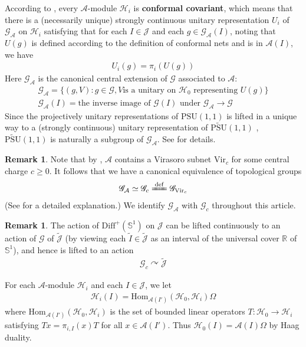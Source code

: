 \documentclass[11pt,b5paper,notitlepage]{article}
\theoremstyle{definition}
\newtheorem{rem}[df]{Remark}
\theoremstyle{plain}
\newcommand{\mc}{\mathcal}
\newcommand{\wtd}{\widetilde}
\newcommand{\Hom}{\mathrm{Hom}}
\newcommand{\Diffp}{\mathrm{Diff}^+}
\newcommand{\PSU}{\mathrm{PSU}(1,1)}
\newcommand{\Vir}{\mathrm{Vir}}
\newcommand{\scr}{\mathscr}
\newcommand{\Jtd}{\widetilde{\mathcal J}}
\newcommand{\Rbb}{\mathbb R}
\newcommand{\UPSU}{\widetilde{\mathrm{PSU}}(1,1)}
\newcommand{\Sbb}{{\mathbb S}}
\newcommand{\Gc}{\mathscr G_c}
\numberwithin{equation}{section}
\begin{document}
According to \cite{Hen19}, every $\mc A$-module $\mc H_i$ is \textbf{conformal covariant}, which means that there is a (necessarily unique) strongly continuous unitary representation $U_i$ of $\scr G_{\mc A}$ on $\mc H_i$ satisfying that for each $I\in\mc J$ and each $g\in\scr G_{\mc A}(I)$, noting that $U(g)$ is defined according to the definition of conformal nets and is in $\mc A(I)$, we have
\begin{align}\label{eq9}
U_i(g)=\pi_i(U(g))
\end{align}
Here $\scr G_{\mc A}$ is the canonical central extension of $\scr G$ associated to $\mc A$:
\begin{gather*}
\scr G_{\mc A}=\{(g,V):g\in\scr G,V\text{is a unitary on $\mc H_0$ representing $U(g)$}\}\\
\scr G_{\mc A}(I)=\text{the inverse image of $\scr G(I)$ under $\scr G_{\mc A}\rightarrow\scr G$}
\end{gather*}
Since the projectively unitary representations of $\PSU$ is lifted in a unique way to a (strongly continuous) unitary representation of $\UPSU$ \cite{Bar54}, $\UPSU$ is naturally a subgroup of $\scr G_{\mc A}$.  See \cite[Sec. 2.1]{Gui21a} for details. 

\begin{rem}
Note that by \cite[Thm. A.1]{Car04}, $\mc A$ contains a Virasoro subnet $\Vir_c$ for some central charge $c\geq0$. It follows that we have a canonical equivalence of topological groups
\begin{align}
\scr G_{\mc A}\simeq\scr G_c\xlongequal{\mathrm{def}} \scr G_{\Vir_c}
\end{align}
(See \cite[Sec. 1]{Gui21c} for a detailed explanation.) We identify $\scr G_{\mc A}$ with $\Gc$ throughout this article.
\end{rem}


\begin{rem}\label{lb50}
The action of $\Diffp(\Sbb^1)$ on $\mc J$ can be lifted continuously to an action of $\scr G$ of $\Jtd$ (by viewing each $\wtd I\in\Jtd$ as an interval of the universal cover $\Rbb$ of $\Sbb^1$), and hence is lifted to an action
\begin{align*}
\scr G_c\curvearrowright\Jtd
\end{align*}
\end{rem}


For each $\mc A$-module $\mc H_i$ and each $I\in\mc J$, we let
\begin{align}
\mc H_i(I)=\Hom_{\mc A(I')}(\mc H_0,\mc H_i)\Omega  \label{eq13}
\end{align}
where $\Hom_{\mc A(I')}(\mc H_0,\mc H_i)$ is the set of bounded linear operators $T:\mc H_0\rightarrow \mc H_i$ satisfying $Tx=\pi_{i,I}(x)T$ for all $x\in\mc A(I')$. Thus $\mc H_0(I)=\mc A(I)\Omega$ by Haag duality.
\end{document}
